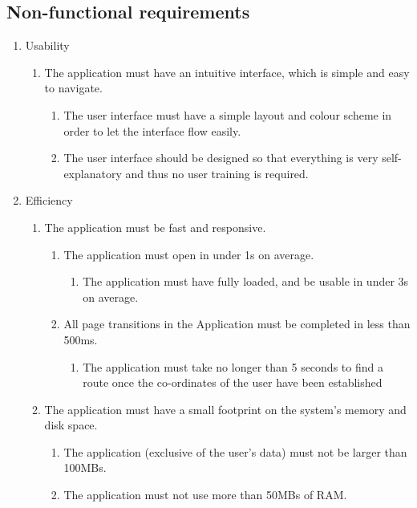 \documentclass[10pt,a4paper,oneside]{report}
\begin{document}
\subsection*{Non-functional requirements}
\small{
\begin{enumerate}
  \item{Usability}
    \begin{enumerate}[label*=\arabic*.]
      \item{The application must have an intuitive interface, which is simple and easy to navigate.}
        \begin{enumerate}[label*=\arabic*.]
          \item{The user interface must have a simple layout and colour scheme in order to let the interface flow easily.}
          \item{The user interface should be designed so that everything is very self-explanatory and thus no user training is required.}
        \end{enumerate}
    \end{enumerate}

    \item{Efficiency}
      \begin{enumerate}[label*=\arabic*.]
      \item{The application must be fast and responsive.}
        \begin{enumerate}[label*=\arabic*.]
        \item{The application must open in under 1s on average.}
          \begin{enumerate}[label*=\arabic*.]
          \item{The application must have fully loaded, and be usable in under 3s on average.}
          \end{enumerate}
        \item{All page transitions in the Application must be completed in less than 500ms.}
          \begin{enumerate}[label*=\arabic*.]
          \item{The application must take no longer than 5 seconds to find a route once the co-ordinates of the user have been established}
          \end{enumerate}
        \end{enumerate}
      \item{The application must have a small footprint on the system’s memory and disk space.}
        \begin{enumerate}[label*=\arabic*.]
        \item{The application (exclusive of the user’s data) must not be larger than 100MBs.}
        \item{The application must not use more than 50MBs of RAM.}
        \end{enumerate}
      \end{enumerate}


\end{enumerate}}
\end{document}
